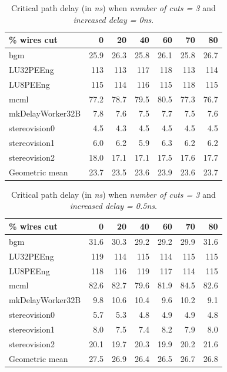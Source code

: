 \documentclass{sig-alternate-2013}
\begin{document}
\begin{table}[!htbp]
\begin{tabular}{|l|r|r|r|r|r|r|}
\hline
\% wires cut & 0 & 20 & 40 & 60 & 70 & 80 \\ \hline  \hline
bgm & 25.9 & 26.3 & 25.8 & 26.1 & 25.8 & 26.7 \\ \hline
LU32PEEng & 113 & 113 & 117 & 118 & 113 & 114 \\ \hline
LU8PEEng & 115 & 114 & 116 & 115 & 118 & 115 \\ \hline
mcml & 77.2 & 78.7 & 79.5 & 80.5 & 77.3 & 76.7 \\ \hline
mkDelayWorker32B & 7.8 & 7.6 & 7.5 & 7.7 & 7.5 & 7.6 \\ \hline
stereovision0 & 4.5 & 4.3 & 4.5 & 4.5 & 4.5 & 4.5 \\ \hline
stereovision1 & 6.0 & 6.2 & 5.9 & 6.3 & 6.2 & 6.2 \\ \hline
stereovision2 & 18.0 & 17.1 & 17.1 & 17.5 & 17.6 & 17.7 \\ \hline
Geometric mean & 23.7 & 23.5 & 23.6 & 23.9 & 23.6 & 23.7 \\ \hline
\end{tabular}
\caption{Critical path delay (in \textit{ns}) when \textit{number of cuts = 3} and \textit{increased delay = 0ns}.}
\label{table:delay0}
\end{table}

\begin{table}[!htbp]
\begin{tabular}{|l|r|r|r|r|r|r|}
\hline
\% wires cut & 0 & 20 & 40 & 60 & 70 & 80 \\ \hline \hline
bgm & 31.6 & 30.3 & 29.2 & 29.2 & 29.9 & 31.6 \\ \hline
LU32PEEng & 119 & 114 & 115 & 114 & 115 & 115 \\ \hline
LU8PEEng & 118 & 116 & 119 & 117 & 114 & 115 \\ \hline
mcml & 82.6 & 82.7 & 79.6 & 81.9 & 84.5 & 82.6 \\ \hline
mkDelayWorker32B & 9.8 & 10.6 & 10.4 & 9.6 & 10.2 & 9.1 \\ \hline
stereovision0 & 5.7 & 5.3 & 4.8 & 4.9 & 4.9 & 4.8 \\ \hline
stereovision1 & 8.0 & 7.5 & 7.4 & 8.2 & 7.9 & 8.0 \\ \hline
stereovision2 & 20.1 & 19.7 & 20.3 & 19.9 & 20.2 & 21.6 \\ \hline
Geometric mean & 27.5 & 26.9 & 26.4 & 26.5 & 26.7 & 26.8 \\ \hline
\end{tabular}
\caption{Critical path delay (in \textit{ns}) when \textit{number of cuts = 3} and \textit{increased delay = 0.5ns}.}
\label{table:delay500}
\end{table}
\end{document}
